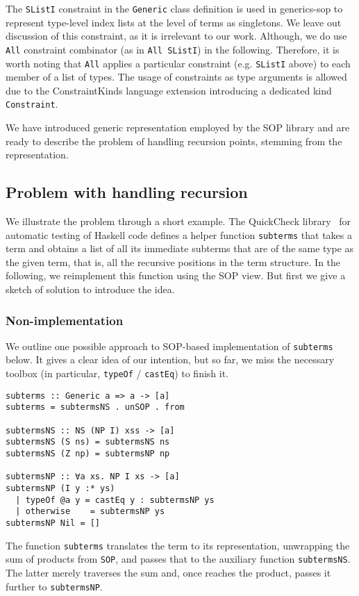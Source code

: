 \documentclass[runningheads]{llncs}
\newcommand{\K}[1]{\lstinline[style=fancy]{#1}}
\begin{document}
The \K{SListI} constraint in the \K{Generic} class definition is used in \textsf{generics-sop} to represent type-level index lists at the level of terms as singletons. We leave out discussion of this constraint, as it is irrelevant to our work. Although, we do use \K{All} constraint combinator (as in \K{All SListI}) in the following. Therefore, it is worth noting that \K{All} applies a particular constraint (e.g. \K{SListI} above) to each member of a list of types. The usage of constraints as type arguments is allowed due to the \textsf{ConstraintKinds} language extension introducing a dedicated kind \K{Constraint}.

We have introduced generic representation employed by the SOP library and are ready to describe the problem of handling recursion points, stemming from the representation. 

\subsection{Problem with handling recursion}
\label{subsec:recursion-problem}

We illustrate the problem through a short example. The \textsf{QuickCheck} library~\cite{Claessen2011} for automatic testing of Haskell code defines a helper function \K{subterms} that takes a term and obtains a list of all its immediate subterms that are of the same type as the given term, that is, all the recursive positions in the term structure. In the following, we reimplement this function using the SOP view. But first we give a sketch of solution to introduce the idea.

\subsubsection{Non-implementation}

We outline one possible approach to SOP-based implementation of \K{subterms} below. It gives a clear idea of our intention, but so far, we miss the necessary toolbox (in particular, \K{typeOf} / \K{castEq}) to finish it.
\begin{lstlisting}[style=fancy]
subterms :: Generic a => a -> [a]
subterms = subtermsNS . unSOP . from

subtermsNS :: NS (NP I) xss -> [a]
subtermsNS (S ns) = subtermsNS ns
subtermsNS (Z np) = subtermsNP np

subtermsNP :: ∀a xs. NP I xs -> [a]
subtermsNP (I y :* ys)
  | typeOf @a y = castEq y : subtermsNP ys
  | otherwise    = subtermsNP ys
subtermsNP Nil = []
\end{lstlisting}
The function \K{subterms} translates the term to its representation, unwrapping the sum of products from \K{SOP}, and passes that to the auxiliary function \K{subtermsNS}. The latter merely traverses the sum and, once reaches the product,  passes it further to \K{subtermsNP}.
\end{document}
